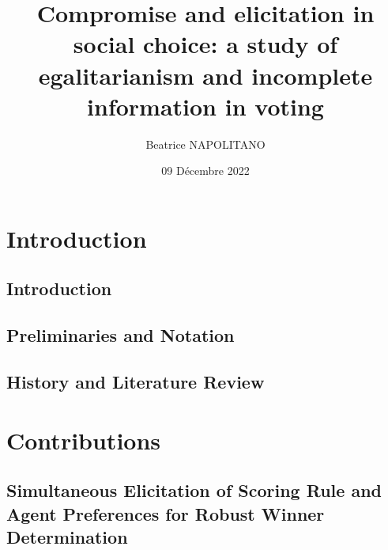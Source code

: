 \documentclass[a4paper, 11pt,twoside,openright]{book}
\title{Compromise and elicitation in social choice: a study of egalitarianism and incomplete information in voting}
\author{Beatrice NAPOLITANO}
\institute{l'Université Paris-Dauphine}
\date{09 Décembre 2022}
\begin{document}
\hypersetup{pageanchor=false}
\begin{titlepage}
\maketitle{}
\end{titlepage}

\frontmatter

\begingroup
\hypersetup{hidelinks}

\tableofcontents

\listoffigures
{}

\listoftables
{}

\endgroup

\printglossary[toctitle=List of Abbreviations,title=List of Abbreviations,type=\acronymtype]

\mainmatter

\part{Introduction} 

	\chapter{Introduction}
		\label{ch:intro}
		
			
	\chapter{Preliminaries and Notation}
		\label{ch:preliminaries}
		
	
	\chapter{History and Literature Review}
		\label{ch:literature}
		
		
		
		
	
\part{Contributions}
	\label{part:contributions}

	\chapter[Simultaneous Elicitation of PSR and Agent Preferences]{Simultaneous Elicitation of Scoring Rule and Agent Preferences for Robust Winner Determination}
		\label{ch:minimax}
		
\end{document}
